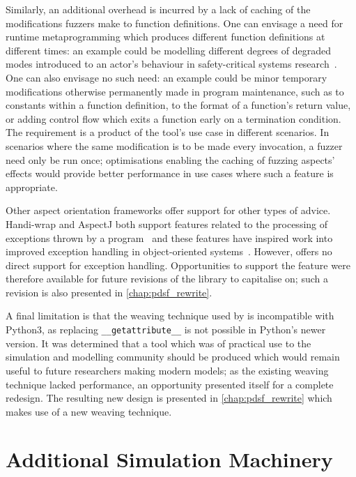 Similarly, an additional overhead is incurred by a lack of caching of the
modifications fuzzers make to function definitions. One can envisage a need for
runtime metaprogramming which produces different function definitions at
different times: an example could be modelling different degrees of degraded
modes introduced to an actor's behaviour in safety-critical systems
research~\cite{johnson2007degradedmodes}. One can also envisage no such need: an
example could be minor temporary modifications otherwise permanently made in
program maintenance, such as to constants within a function definition, to the
format of a function's return value, or adding control flow which exits a
function early on a termination condition. The requirement is a product of the
tool's use case in different scenarios. In scenarios where the same modification
is to be made every invocation, a fuzzer need only be run once; optimisations
enabling the caching of fuzzing aspects' effects would provide better
performance in use cases where such a feature is appropriate.

Other aspect orientation frameworks offer support for other types of advice.
Handi-wrap and AspectJ both support features related to the processing of
exceptions thrown by a program~\cite{Baker_2002,aspectj_intro} and these
features have inspired work into improved exception handling in object-oriented
systems~\cite{millham2011aopandoopsecurity}. However, \pydysofu
offers no direct support for exception handling. Opportunities to support the
feature were therefore available for future revisions of the library to
capitalise on; such a revision is also presented in \cref{chap:pdsf_rewrite}.

A final limitation is that the weaving technique used by \pydysofu is
incompatible with Python3, as replacing \lstinline{__getattribute__} is not
possible in Python's newer version. It was determined that a tool which was of
practical use to the simulation and modelling community should be produced which
would remain useful to future researchers making modern models; as the existing
weaving technique lacked performance, an opportunity presented itself for a
complete redesign. The resulting new design is presented in
\cref{chap:pdsf_rewrite} which makes use of a new weaving technique.



\section{Additional Simulation Machinery}\label{sec:prior_work_machinery}

